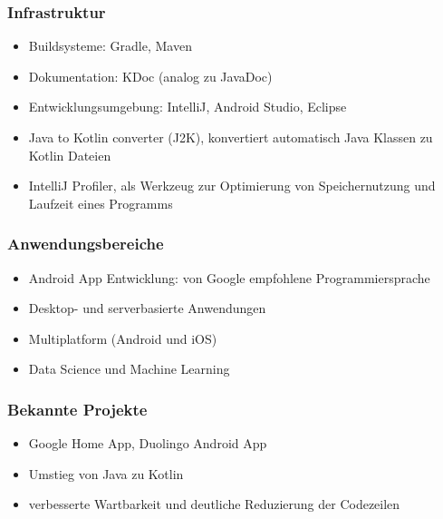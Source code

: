 \documentclass{beamer}
\begin{document}
\begin{frame}
\frametitle{Infrastruktur}
\begin{itemize}
\onehalfspacing
    \item Buildsysteme: Gradle, Maven
    \item Dokumentation: KDoc (analog zu JavaDoc)
    \item Entwicklungsumgebung: IntelliJ, Android Studio, Eclipse
    \item Java to Kotlin converter (J2K), konvertiert automatisch Java Klassen zu Kotlin Dateien
    \item IntelliJ Profiler, als Werkzeug zur Optimierung von Speichernutzung und Laufzeit eines Programms
\end{itemize}
\end{frame}

\begin{frame}
\frametitle{Anwendungsbereiche}
\begin{itemize}
\onehalfspacingy
    \item Android App Entwicklung: von Google empfohlene Programmiersprache
    \item Desktop- und serverbasierte Anwendungen
    \item Multiplatform (Android und iOS)
    \item Data Science und Machine Learning
\end{itemize}
\end{frame}

\begin{frame}
\frametitle{Bekannte Projekte}
\begin{itemize}
\onehalfspacing
    \item Google Home App, Duolingo Android App
    \item Umstieg von Java zu Kotlin
    \item verbesserte Wartbarkeit und deutliche Reduzierung der Codezeilen
\end{itemize}
\end{frame}
\end{document}
